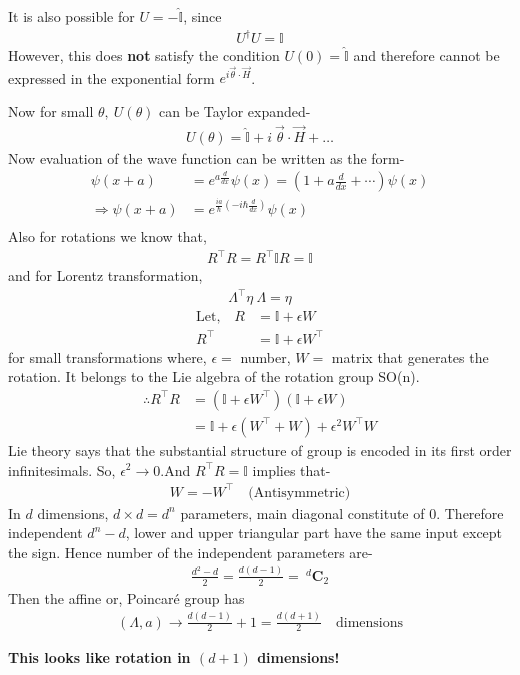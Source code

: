 \documentclass[14pt]{article} %
\begin{document}
\begin{tcolorbox}[ title=\textbf{Note}]
It is also possible for $U = -\hat{\mathbb{I}}$, since
\begin{align*}
U^\dagger U = \mathbb{I}
\end{align*}
However, this does \textbf{not} satisfy the condition $U(0) = \hat{\mathbb{I}}$ and therefore cannot be expressed in the exponential form $e^{ i \vec{\theta}\cdot\vec{H}}$.
\end{tcolorbox}
\noindent
Now for small $\theta,~U(\theta)$ can be Taylor expanded-
\begin{align*}
U(\theta) = \hat{\mathbb{I}} + i ~\vec{\theta}\cdot \vec{H} + \dots
\end{align*}
Now evaluation of the wave function can be written as the form-
\begin{align*}
\psi(x + a) &= e^{a \frac{d}{dx}} \psi(x) = \left(1 + a \frac{d}{dx} + \cdots \right) \psi(x) \\
\Rightarrow \psi(x + a) &= e^{\frac{ia}{\hbar} (-i \hbar \frac{d}{dx})} \psi(x) \\
\end{align*}
Also for rotations we know that,
\begin{align*}
R^\top R = R^\top \mathbb{I} R = \mathbb{I}
\end{align*}
and for Lorentz transformation,
\begin{align*}
\Lambda^\top \eta~ \Lambda = \eta
\end{align*}
\begin{align*}
\text{Let,}\quad R &= \mathbb{I} + \epsilon W \\
R^\top &= \mathbb{I} + \epsilon W^\top
\end{align*}
for small transformations where, $\epsilon =$ number, $W=$ matrix that generates the rotation. It belongs to the Lie algebra of the rotation group SO(n).
\begin{align*}
\therefore R^\top R &= (\mathbb{I} + \epsilon W^\top)(\mathbb{I} + \epsilon W) \\
&= \mathbb{I} + \epsilon(W^\top + W) + \epsilon^2 W^\top W 
\end{align*}
Lie theory says that the substantial structure of group is encoded in its first order infinitesimals. So, $\epsilon^2 \rightarrow0$.And $R^\top R = \mathbb{I}$ implies that-
\begin{align*}
W = -W^\top \quad \text{(Antisymmetric)}
\end{align*}
In $d$ dimensions, $d \times d = d^n$ parameters, main diagonal constitute of 0. Therefore independent $d^n -d$, lower and upper triangular part have the same input except the sign.
Hence number of the independent parameters are-
\begin{align*}
\frac{d^2 -d }{2} = \frac{d(d-1)}{2} = ~^d\mathbf{C}_2
\end{align*}
Then the affine or, Poincaré group has 
\begin{align*}
(\Lambda,a) \rightarrow \frac{d(d-1)}{2} + 1 = \frac{d(d+1)}{2} \quad \text{dimensions}
\end{align*}
\begin{center}
    \textbf{This looks like rotation in $(d + 1)$ dimensions!}
\end{center}
\end{document}
